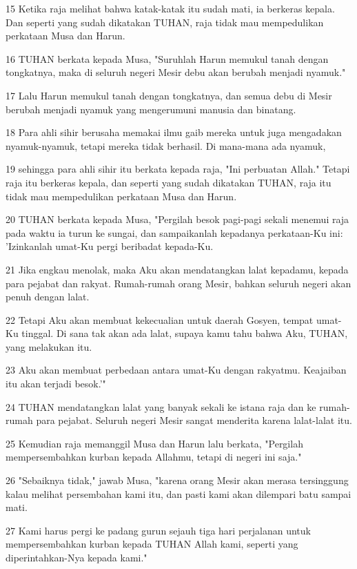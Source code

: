 \par 15 Ketika raja melihat bahwa katak-katak itu sudah mati, ia berkeras kepala. Dan seperti yang sudah dikatakan TUHAN, raja tidak mau mempedulikan perkataan Musa dan Harun.
\par 16 TUHAN berkata kepada Musa, "Suruhlah Harun memukul tanah dengan tongkatnya, maka di seluruh negeri Mesir debu akan berubah menjadi nyamuk."
\par 17 Lalu Harun memukul tanah dengan tongkatnya, dan semua debu di Mesir berubah menjadi nyamuk yang mengerumuni manusia dan binatang.
\par 18 Para ahli sihir berusaha memakai ilmu gaib mereka untuk juga mengadakan nyamuk-nyamuk, tetapi mereka tidak berhasil. Di mana-mana ada nyamuk,
\par 19 sehingga para ahli sihir itu berkata kepada raja, "Ini perbuatan Allah." Tetapi raja itu berkeras kepala, dan seperti yang sudah dikatakan TUHAN, raja itu tidak mau mempedulikan perkataan Musa dan Harun.
\par 20 TUHAN berkata kepada Musa, "Pergilah besok pagi-pagi sekali menemui raja pada waktu ia turun ke sungai, dan sampaikanlah kepadanya perkataan-Ku ini: 'Izinkanlah umat-Ku pergi beribadat kepada-Ku.
\par 21 Jika engkau menolak, maka Aku akan mendatangkan lalat kepadamu, kepada para pejabat dan rakyat. Rumah-rumah orang Mesir, bahkan seluruh negeri akan penuh dengan lalat.
\par 22 Tetapi Aku akan membuat kekecualian untuk daerah Gosyen, tempat umat-Ku tinggal. Di sana tak akan ada lalat, supaya kamu tahu bahwa Aku, TUHAN, yang melakukan itu.
\par 23 Aku akan membuat perbedaan antara umat-Ku dengan rakyatmu. Keajaiban itu akan terjadi besok.'"
\par 24 TUHAN mendatangkan lalat yang banyak sekali ke istana raja dan ke rumah-rumah para pejabat. Seluruh negeri Mesir sangat menderita karena lalat-lalat itu.
\par 25 Kemudian raja memanggil Musa dan Harun lalu berkata, "Pergilah mempersembahkan kurban kepada Allahmu, tetapi di negeri ini saja."
\par 26 "Sebaiknya tidak," jawab Musa, "karena orang Mesir akan merasa tersinggung kalau melihat persembahan kami itu, dan pasti kami akan dilempari batu sampai mati.
\par 27 Kami harus pergi ke padang gurun sejauh tiga hari perjalanan untuk mempersembahkan kurban kepada TUHAN Allah kami, seperti yang diperintahkan-Nya kepada kami."
